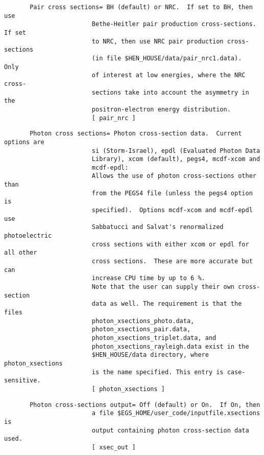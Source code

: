 \begin{verbatim}
       Pair cross sections= BH (default) or NRC.  If set to BH, then use
                        Bethe-Heitler pair production cross-sections.  If set
                        to NRC, then use NRC pair production cross-sections
                        (in file $HEN_HOUSE/data/pair_nrc1.data).  Only
                        of interest at low energies, where the NRC cross-
                        sections take into account the asymmetry in the
                        positron-electron energy distribution.
                        [ pair_nrc ]
\end{verbatim}
\begin{verbatim}
       Photon cross sections= Photon cross-section data.  Current options are
                        si (Storm-Israel), epdl (Evaluated Photon Data
                        Library), xcom (default), pegs4, mcdf-xcom and
                        mcdf-epdl:
                        Allows the use of photon cross-sections other than
                        from the PEGS4 file (unless the pegs4 option is
                        specified).  Options mcdf-xcom and mcdf-epdl use
                        Sabbatucci and Salvat's renormalized photoelectric
                        cross sections with either xcom or epdl for all other
                        cross sections.  These are more accurate but can
                        increase CPU time by up to 6 %.
                        Note that the user can supply their own cross-section
                        data as well. The requirement is that the files
                        photon_xsections_photo.data,
                        photon_xsections_pair.data,
                        photon_xsections_triplet.data, and
                        photon_xsections_rayleigh.data exist in the
                        $HEN_HOUSE/data directory, where photon_xsections
                        is the name specified. This entry is case-sensitive.
                        [ photon_xsections ]
\end{verbatim}
\begin{verbatim}
       Photon cross-sections output= Off (default) or On.  If On, then
                        a file $EGS_HOME/user_code/inputfile.xsections is
                        output containing photon cross-section data used.
                        [ xsec_out ]
\end{verbatim}
